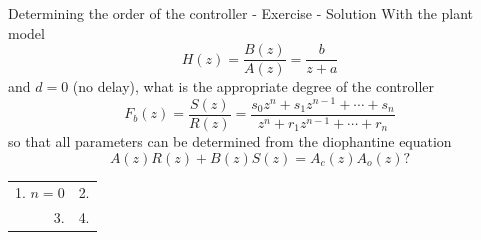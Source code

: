 \documentclass[presentation,aspectratio=169]{beamer}
\begin{document}
\begin{frame}[label={sec:orgbaf4096}]{Determining the order of the controller - Exercise - Solution}
With the plant model \[H(z) = \frac{B(z)}{A(z)} = \frac{b}{z + a}\] and \(d=0\) (no delay), what is the appropriate degree of the controller \[F_b(z) = \frac{S(z)}{R(z)} = \frac{s_0z^n + s_1z^{n-1} + \cdots + s_n}{z^n + r_1 z^{n-1} + \cdots + r_n}\]
so that all parameters can be determined from the diophantine equation
\[ A(z)R(z) + B(z)S(z) = A_c(z)A_o(z)?\]
\begin{center}
\begin{tabular}{rr}
1. \(n = 0\) & 2.\\
3. & 4.\\
\end{tabular}
\end{center}
\end{frame}
\end{document}
